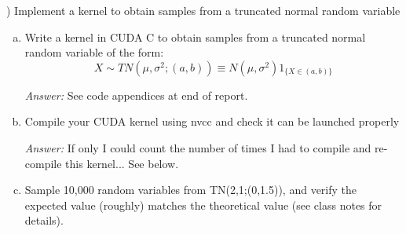 \documentclass[a4paper, 11pt]{report}
\begin{document}
	\vspace{-7pt}
	) Implement a kernel to obtain samples from a truncated normal random variable 
	\begin{enumerate}[a)] %
		\item Write a kernel in CUDA C to obtain samples from a truncated normal random variable of the form: 
			$$ X \sim TN(\mu,\sigma^2;(a,b)) \equiv N(\mu,\sigma^2)1_{ \{ X \in (a,b) \} }$$ 
			
			\noindent \textit{Answer:} See code appendices at end of report.

		\item Compile your CUDA kernel using nvcc and check it can be launched properly 
		
			\noindent \textit{Answer:} If only I could count the number of times I had to compile and re-compile this kernel...  See below.
			
		\item Sample 10,000 random variables from TN(2,1;(0,1.5)), and verify the expected value (roughly) matches the theoretical value (see class notes 
			for details). 
			

\end{enumerate}
\end{document}
